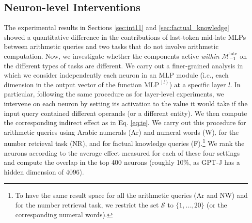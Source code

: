 \documentclass[11pt]{article}
\newcommand{\atl}[2]{#1^{(#2)}}
\begin{document}
\subsection{Neuron-level Interventions}
The experimental results in Sections \ref{sec:int11} and \ref{sec:factual_knowledge} showed a quantitative difference in the contributions of last-token mid-late MLPs between arithmetic queries and two tasks that do not involve arithmetic computation. Now, we investigate whether the components active \textit{within} $\mathcal{M}_{-1}^{\text{late}}$ on the different types of tasks are different.
We carry out a finer-grained analysis in which 
we consider independently each neuron in an MLP module (i.e., each dimension in the output vector of the function $\atl{\mathrm{MLP}}{l}$) at a specific layer $l$.
In particular, following the same procedure as for layer-level experiments, we intervene on each neuron by setting its activation to the value it would take if the input query contained different operands (or a different entity). We then compute the corresponding indirect effect as in Eq. \ref{eq:ie}.
We carry out this procedure for arithmetic queries using Arabic numerals (Ar) and numeral words (W), for the number retrieval task (NR), and for factual knowledge queries (F).\footnote{ 
To have the same result space for all the arithmetic queries (Ar and NW) and for the number retrieval task, we restrict the set $\mathcal{S}$ to $\{1, \dots, 20\}$ (or the corresponding numeral words).}
We rank the neurons according to the average effect measured for each of these four settings and compute the overlap in the top 400 neurons (roughly 10\%, as GPT-J has a hidden dimension of 4096).
\end{document}
